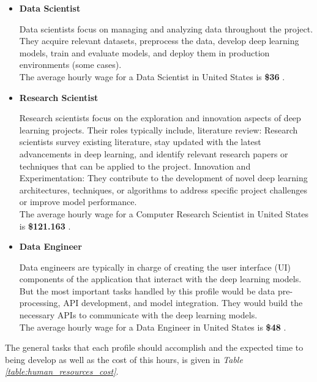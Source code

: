 \begin{itemize}
  \item \textbf{Data Scientist}

    Data scientists focus on managing and analyzing data throughout the
    project. They acquire relevant datasets, preprocess the data, develop deep
    learning models, train and evaluate models, and deploy them in production
    environments (some cases). \\

    The average hourly wage for a Data Scientist in United States is
    \textbf{\$36} \cite{SalaryDataScientist}. \\

  \item \textbf{Research Scientist}

    Research scientists focus on the exploration and innovation aspects of deep
    learning projects. Their roles typically include, literature review:
    Research scientists survey existing literature, stay updated with the
    latest advancements in deep learning, and identify relevant research papers
    or techniques that can be applied to the project. Innovation and
    Experimentation: They contribute to the development of novel deep learning
    architectures, techniques, or algorithms to address specific project
    challenges or improve model performance. \\

    The average hourly wage for a Computer Research Scientist in United States
    is \textbf{\$121.163} \cite{SalaryResearchScientist}. \\

  \item \textbf{Data Engineer}

    Data engineers are typically in charge of creating the user interface (UI)
    components of the application that interact with the deep learning models.
    But the most important tasks handled by this profile would be data
    pre-processing, API development, and model integration. They would build
    the necessary APIs to communicate with the deep learning models. \\

    The average hourly wage for a Data Engineer in United States is
    \textbf{\$48} \cite{SalaryDataEnginner}. \\

\end{itemize}

The general tasks that each profile should accomplish and the expected time to
being develop as well as the cost of this hours, is given in \textit{Table
\ref{table:human_resources_cost}}.

